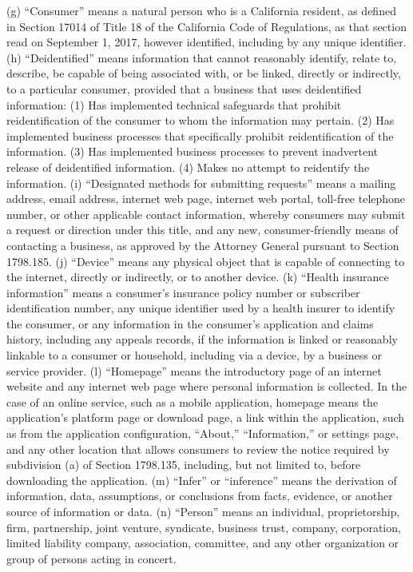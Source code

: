 (g) “Consumer” means a natural person who is a California resident, as defined in Section 17014 of Title 18 of the California Code of Regulations, as that section read on September 1, 2017, however identified, including by any unique identifier.
(h) “Deidentified” means information that cannot reasonably identify, relate to, describe, be capable of being associated with, or be linked, directly or indirectly, to a particular consumer, provided that a business that uses deidentified information:
(1) Has implemented technical safeguards that prohibit reidentification of the consumer to whom the information may pertain.
(2) Has implemented business processes that specifically prohibit reidentification of the information.
(3) Has implemented business processes to prevent inadvertent release of deidentified information.
(4) Makes no attempt to reidentify the information.
(i) “Designated methods for submitting requests” means a mailing address, email address, internet web page, internet web portal, toll-free telephone number, or other applicable contact information, whereby consumers may submit a request or direction under this title, and any new, consumer-friendly means of contacting a business, as approved by the Attorney General pursuant to Section 1798.185.
(j) “Device” means any physical object that is capable of connecting to the internet, directly or indirectly, or to another device.
(k) “Health insurance information” means a consumer’s insurance policy number or subscriber identification number, any unique identifier used by a health insurer to identify the consumer, or any information in the consumer’s application and claims history, including any appeals records, if the information is linked or reasonably linkable to a consumer or household, including via a device, by a business or service provider.
(l) “Homepage” means the introductory page of an internet website and any internet web page where personal information is collected. In the case of an online service, such as a mobile application, homepage means the application’s platform page or download page, a link within the application, such as from the application configuration, “About,” “Information,” or settings page, and any other location that allows consumers to review the notice required by subdivision (a) of Section 1798.135, including, but not limited to, before downloading the application.
(m) “Infer” or “inference” means the derivation of information, data, assumptions, or conclusions from facts, evidence, or another source of information or data.
(n) “Person” means an individual, proprietorship, firm, partnership, joint venture, syndicate, business trust, company, corporation, limited liability company, association, committee, and any other organization or group of persons acting in concert.
